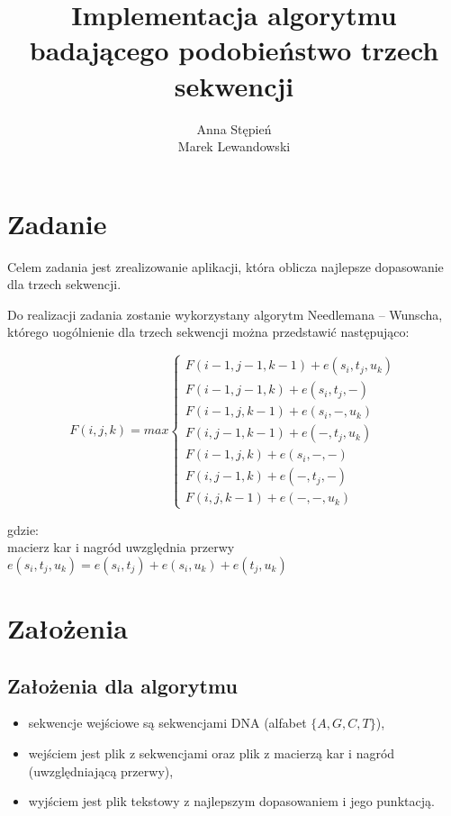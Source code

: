 \documentclass[12pt, a4paper]{article}
\title{\textbf{Implementacja algorytmu badającego podobieństwo trzech sekwencji}}
\author{Anna Stępień \\ Marek Lewandowski}
\date{}
\begin{document}
\maketitle

\section{Zadanie}
Celem zadania jest zrealizowanie aplikacji, która oblicza najlepsze dopasowanie dla trzech sekwencji. 

Do realizacji zadania zostanie wykorzystany algorytm Needlemana -- Wunscha, którego uogólnienie dla trzech sekwencji można przedstawić następująco:

\begin{equation}
  F(i, j, k)= max \begin{cases}
    F(i-1, j-1, k-1) + e(s_i, t_j, u_k)\\
    F(i-1, j-1, k) + e(s_i, t_j, -)\\
    F(i-1, j, k-1) + e(s_i, -,u_k)\\
    F(i, j-1, k-1) + e(-, t_j, u_k)\\
    F(i-1, j, k) + e(s_i, -, -)\\
    F(i, j-1, k) + e(-, t_j, -)\\
    F(i, j, k-1) + e(-, -, u_k)
  \end{cases}
\end{equation}

gdzie:\\
macierz kar i nagród uwzględnia przerwy\\
$e(s_i, t_j, u_k) = e(s_i, t_j) + e(s_i, u_k) + e(t_j, u_k)$\\
\section{Założenia}

\subsection{Założenia dla algorytmu}
\begin{itemize}
\item sekwencje wejściowe są sekwencjami DNA (alfabet $\{A, G, C, T\}$),
\item wejściem jest plik z sekwencjami oraz plik z macierzą kar i nagród (uwzględniającą przerwy),
\item wyjściem jest plik tekstowy z najlepszym dopasowaniem i jego punktacją.
\end{itemize}
\end{document}
